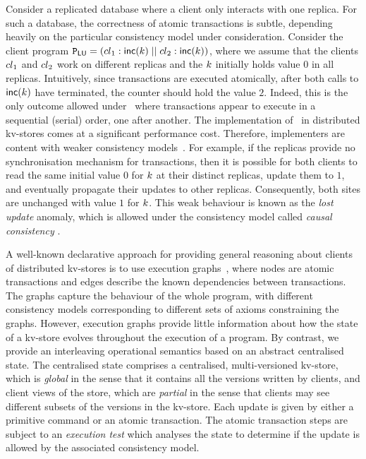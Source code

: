 Consider a replicated database where
a client only interacts with one replica.
For such a database, the 
correctness of atomic transactions is subtle, depending heavily on the
particular consistency model under consideration.  
Consider the client program
$\mathtt{P}_{\mathsf{LU}} = \left({cl}_1 : \mathsf{inc}(k) \;|| \; {cl}_2:
  \mathsf{inc}(k) \right)$, 
where we assume that the clients \( {cl}_1 \) and \( {cl}_2 \) work on different replicas and
the \(k\) initially holds value \(0\) in all replicas.
Intuitively, since transactions are executed atomically, after both
calls to \(\mathsf{inc}(k)\) have terminated, the counter should hold 
the value \(2\).
Indeed, this is the only outcome allowed under 
\SER\, where transactions
appear to execute in a sequential (serial) order, one after another.
The implementation of  \SER\ in distributed kv-stores comes at a
significant performance cost. Therefore, implementers are content with
{weaker} consistency models~\cite{ramp,rola,cops,wren,redblue,PSI,NMSI,gdur,clocksi,distrsi}. 
For example, if the replicas provide no synchronisation mechanism for transactions,
then it is possible for both clients to read the same initial value \(0\) for \(k\) at their
distinct replicas, update them to \(1\), and eventually propagate their updates to other replicas. 
Consequently, both
sites  are unchanged with value  \(1\) for \(k\).
This weak behaviour is known as the \emph{lost update} anomaly, which
is  allowed under the consistency model called {\em causal consistency} \cite{cops,wren,redblue}.



A well-known declarative approach for providing general reasoning
about clients of distributed kv-stores is to use  execution 
graphs~\cite{adya-icde,adya,framework-concur,ev_transactions},
where nodes are atomic transactions and edges describe the
known dependencies between transactions. The graphs capture the
behaviour of the whole program, with different consistency models
corresponding to different sets of axioms constraining the graphs. 
However, execution graphs provide little information about how the 
state of a kv-store evolves throughout the execution of a program.
By contrast, we provide an interleaving operational semantics based on an
abstract centralised state. The centralised state comprises a
centralised, multi-versioned kv-store, which is {\em global} in the
sense that it contains all the versions written by clients, and client views of the store,
which are {\em partial} in the sense that clients may see different 
subsets of the versions in the kv-store. Each update is given by either
a primitive command or an atomic transaction. The atomic
transaction steps are subject to an {\em execution test} which
analyses the state to determine if the update is allowed by 
the associated  consistency model. 



